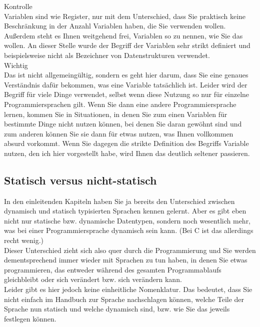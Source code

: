 Kontrolle\\

Variablen sind wie Register, nur mit dem Unterschied, dass Sie praktisch keine Beschränkung in der Anzahl Variablen haben, die Sie verwenden wollen. Außerdem steht es Ihnen weitgehend frei, Variablen so zu nennen, wie Sie das wollen. An dieser Stelle wurde der Begriff der Variablen sehr strikt definiert und beispielsweise nicht als Bezeichner von Datenstrukturen verwendet.\\

Wichtig\\

Das ist nicht allgemeingültig, sondern es geht hier darum, dass Sie eine genaues Verständnis dafür bekommen, was eine Variable tatsächlich ist. Leider wird der Begriff für viele Dinge verwendet, selbst wenn diese Nutzung so nur für einzelne Programmiersprachen gilt. Wenn Sie dann eine andere Programmiersprache lernen, kommen Sie in Situationen, in denen Sie zum einen Variablen für bestimmte Dinge nicht nutzen können, bei denen Sie daran gewöhnt sind und zum anderen können Sie sie dann für etwas nutzen, was Ihnen vollkommen absurd vorkommt. Wenn Sie dagegen die strikte Definition des Begriffs Variable nutzen, den ich hier vorgestellt habe, wird Ihnen das deutlich seltener passieren.\\

\subsection{Statisch versus nicht-statisch}

In den einleitenden Kapiteln haben Sie ja bereits den Unterschied zwischen dynamisch und statisch typisierten Sprachen kennen gelernt. Aber es gibt eben nicht nur statische bzw. dynamische Datentypen, sondern noch wesentlich mehr, was bei einer Programmiersprache dynamisch sein kann. (Bei C ist das allerdings recht wenig.)\\

Dieser Unterschied zieht sich also quer durch die Programmierung und Sie werden dementsprechend immer wieder mit Sprachen zu tun haben, in denen Sie etwas programmieren, das entweder während des gesamten Programmablaufs gleichbleibt oder sich verändert bzw. sich verändern kann.\\

Leider gibt es hier jedoch keine einheitliche Nomenklatur. Das bedeutet, dass Sie nicht einfach im Handbuch zur Sprache nachschlagen können, welche Teile der Sprache nun statisch und welche dynamisch sind, bzw. wie Sie das jeweils festlegen können. \\

